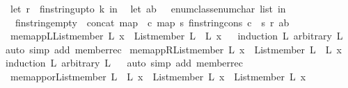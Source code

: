 \begin{isabellebody}
\ {\isacharparenleft}let\ r\ {\isacharequal}\ fin{\isacharunderscore}string{\isacharunderscore}upto\ k\ in\isanewline
\ \ let\ ab\ {\isacharequal}\ \ {\isacharparenleft}enum{\isacharunderscore}class{\isachardot}enum{\isacharcolon}{\isacharcolon}char\ list{\isacharparenright}\ in\isanewline
\ \ fin{\isacharunderscore}string{\isacharunderscore}empty\ {\isacharhash}\ concat\ {\isacharparenleft}map\ {\isacharparenleft}{\isasymlambda}\ c{\isachardot}\ map\ {\isacharparenleft}{\isasymlambda}s{\isachardot}\ fin{\isacharunderscore}string{\isacharunderscore}cons\ c\ \ s{\isacharparenright}\ r{\isacharparenright}\ ab{\isacharparenright}{\isacharparenright}{\isachardoublequoteclose}\isanewline
\isanewline
{}\isamarkupfalse%
\ mem{\isacharunderscore}appL{\isacharcolon}{\isachardoublequoteopen}List{\isachardot}member\ L{}\ x\ {\isasymLongrightarrow}\ List{\isachardot}member\ {\isacharparenleft}L{}\ {\isacharat}\ L{}{\isacharparenright}\ x{\isachardoublequoteclose}\isanewline
%
\isadelimproof
\ \ %
\endisadelimproof
%
\isatagproof
{}\isamarkupfalse%
{\isacharparenleft}induction\ L{}\ arbitrary{\isacharcolon}\ L{}{\isacharparenright}\isanewline
\ \ \isamarkupfalse%
{\isacharparenleft}auto\ simp\ add{\isacharcolon}\ member{\isacharunderscore}rec{\isacharparenright}%
\endisatagproof
{\isafoldproof}%
%
\isadelimproof
\isanewline
%
\endisadelimproof
\isanewline
{}\isamarkupfalse%
\ mem{\isacharunderscore}appR{\isacharcolon}{\isachardoublequoteopen}List{\isachardot}member\ L{}\ x\ {\isasymLongrightarrow}\ List{\isachardot}member\ {\isacharparenleft}L{}\ {\isacharat}\ L{}{\isacharparenright}\ x{\isachardoublequoteclose}\isanewline
%
\isadelimproof
\ \ %
\endisadelimproof
%
\isatagproof
{}\isamarkupfalse%
{\isacharparenleft}induction\ L{}\ arbitrary{\isacharcolon}\ L{}{\isacharparenright}\isanewline
\ \ \isamarkupfalse%
{\isacharparenleft}auto\ simp\ add{\isacharcolon}\ member{\isacharunderscore}rec{\isacharparenright}%
\endisatagproof
{\isafoldproof}%
%
\isadelimproof
\isanewline
%
\endisadelimproof
\isanewline
{}\isamarkupfalse%
\ mem{\isacharunderscore}app{\isacharunderscore}or{\isacharcolon}{\isachardoublequoteopen}List{\isachardot}member\ {\isacharparenleft}L{}\ {\isacharat}\ L{}{\isacharparenright}\ x\ {\isacharequal}\ List{\isachardot}member\ L{}\ x\ {\isasymor}\ List{\isachardot}member\ L{}\ x{\isachardoublequoteclose}\isanewline

\end{isabellebody}
